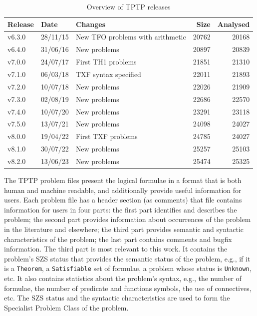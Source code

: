 \documentclass[runningheads]{llncs}
\begin{document}
\begin{table}[htb]
\begin{center}
\setlength{\tabcolsep}{4pt}
\begin{tabular}{ll|l|rr}
Release & Date     & Changes                                 & Size & Analysed \\
\hline
v6.3.0  & 28/11/15 & New TFO problems with arithmetic        &   20762 & 20168 \\
v6.4.0  & 31/06/16 & New problems                            &   20897 & 20839 \\
v7.0.0  & 24/07/17 & First TH1 problems                      &   21851 & 21310 \\
v7.1.0  & 06/03/18 & TXF syntax specified                    &   22011 & 21893 \\
v7.2.0  & 10/07/18 & New problems                            &   22026 & 21909 \\
v7.3.0  & 02/08/19 & New problems                            &   22686 & 22570 \\
v7.4.0  & 10/07/20 & New problems                            &   23291 & 23118 \\
v7.5.0  & 13/07/21 & New problems                            &   24098 & 24027 \\
v8.0.0  & 19/04/22 & First TXF problems                      &   24785 & 24027 \\
v8.1.0  & 30/07/22 & New problems                            &   25257 & 25103 \\
v8.2.0  & 13/06/23 & New problems                            &   25474 & 25325 \\
\end{tabular}
\end{center}
\caption{Overview of TPTP releases}
\label{TPTPReleases}
\end{table}

The TPTP problem files present the logical formulae in a format that is both human and machine 
readable, and additionally provide useful information for users.
Each problem file has a header section (as comments) that file contains information for users
in four parts:
the first part identifies and describes the problem;
the second part provides information about occurrences of the problem in the literature and 
elsewhere;
the third part provides semantic and syntactic characteristics of the problem;
the last part contains comments and bugfix information.
The third part is most relevant to this work. 
It contains the problem's SZS status \cite{SZS03} that provides the semantic status of the 
problem, e.g., if it is a {\tt Theorem}, a {\tt Satisfiable} set of formulae, a problem whose 
status is {\tt Unknown}, etc.
It also contains statistics about the problem's syntax, e.g., the number of formulae, the 
number of predicate and functions symbols, the use of connectives, etc.
The SZS status and the syntactic characteristics are used to form the Specialist Problem Class
of the problem.
\end{document}
